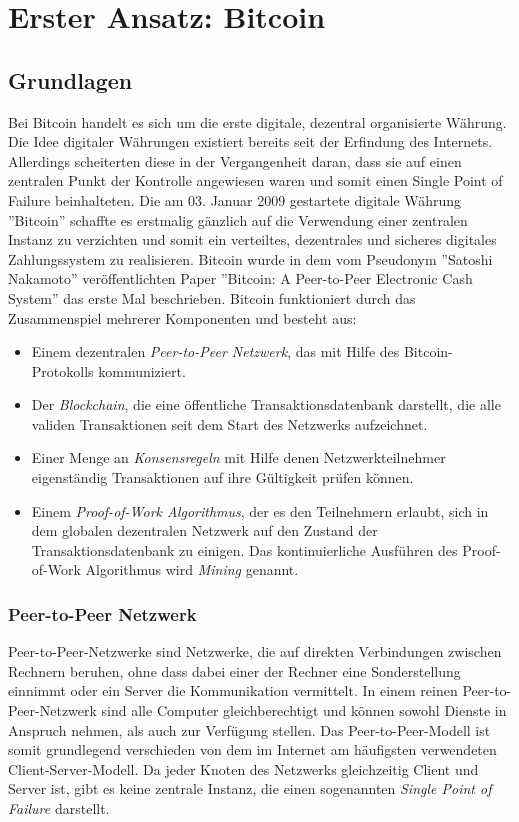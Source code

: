 \chapter{Erster Ansatz: Bitcoin}
\label{btc}

\section{Grundlagen}
\label{btc_grundlagen}
Bei Bitcoin handelt es sich um die erste digitale, dezentral organisierte Währung. Die Idee digitaler Währungen existiert bereits seit der Erfindung des Internets. Allerdings scheiterten diese in der Vergangenheit daran, dass sie auf einen zentralen Punkt der Kontrolle angewiesen waren und somit einen Single Point of Failure beinhalteten. Die am 03. Januar 2009 gestartete digitale Währung ''Bitcoin'' schaffte es erstmalig gänzlich auf die Verwendung einer zentralen Instanz zu verzichten und somit ein verteiltes, dezentrales und sicheres digitales Zahlungssystem zu realisieren. Bitcoin wurde in dem vom Pseudonym ''Satoshi Nakamoto'' veröffentlichten Paper \cite{bitcoin_white_paper} ''Bitcoin: A Peer-to-Peer Electronic Cash System'' das erste Mal beschrieben. Bitcoin funktioniert durch das Zusammenspiel mehrerer Komponenten und besteht aus:

\begin{itemize}
\item Einem dezentralen \textit{Peer-to-Peer Netzwerk}, das mit Hilfe des Bitcoin-Protokolls kommuniziert.
\item Der \textit{Blockchain}, die eine öffentliche Transaktionsdatenbank darstellt, die alle validen Transaktionen seit dem Start des Netzwerks aufzeichnet.
\item Einer Menge an \textit{Konsensregeln} mit Hilfe denen Netzwerkteilnehmer eigenständig Transaktionen auf ihre Gültigkeit prüfen können.
\item Einem \textit{Proof-of-Work Algorithmus}, der es den Teilnehmern erlaubt, sich in dem globalen dezentralen Netzwerk auf den Zustand der Transaktionsdatenbank zu einigen. Das kontinuierliche Ausführen des Proof-of-Work Algorithmus wird \textit{Mining} genannt.
\end{itemize}

\subsection{Peer-to-Peer Netzwerk}
Peer-to-Peer-Netzwerke sind Netzwerke, die auf direkten Verbindungen zwischen Rechnern beruhen, ohne dass dabei einer der Rechner eine Sonderstellung einnimmt oder ein Server die Kommunikation vermittelt. In einem reinen Peer-to-Peer-Netzwerk sind alle Computer gleichberechtigt und können sowohl Dienste in Anspruch nehmen, als auch zur Verfügung stellen. Das Peer-to-Peer-Modell ist somit grundlegend verschieden von dem im Internet am häufigsten verwendeten Client-Server-Modell. Da jeder Knoten des Netzwerks gleichzeitig Client und Server ist, gibt es keine zentrale Instanz, die einen sogenannten \textit{Single Point of Failure} darstellt. 

